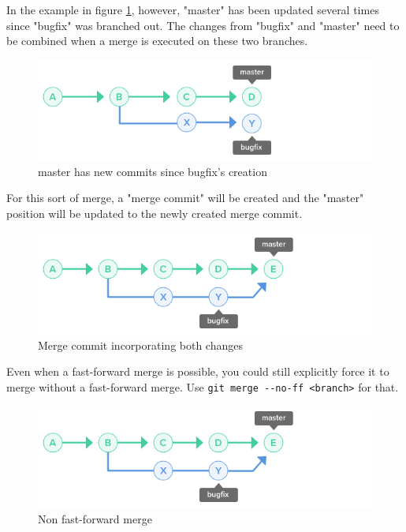 \documentclass[10pt,a4paper,english]{report}
\begin{document}
    In the example in figure \ref{fig:master-advance-bugfix}, however, "master" has been updated several times since "bugfix" was branched out. The changes from "bugfix" and "master" need to be combined when a merge is executed on these two branches.

    \begin{figure}[ht]
    \begin{center}
    \includegraphics[scale=0.5]{images/merge_branch_003.png}
    \end{center}
    \caption{master has new commits since bugfix's creation}
    \label{fig:master-advance-bugfix}
    \end{figure}

    For this sort of merge, a "merge commit" will be created and the "master" position will be updated to the newly created merge commit.

    \begin{figure}[ht]
    \begin{center}
    \includegraphics[scale=0.5]{images/merge_branch_004.png}
    \end{center}
    \caption{Merge commit incorporating both changes}
    \end{figure}

    Even when a fast-forward merge is possible, you could still explicitly force it to merge without a fast-forward merge. Use \verb|git merge --no-ff <branch>| for that.

    \begin{figure}[ht]
    \begin{center}
    \includegraphics[scale=0.5]{images/merge_branch_004.png}
    \end{center}
    \caption{Non fast-forward merge}
    \label{fig:no-ff-merge}
    \end{figure}
\end{document}

